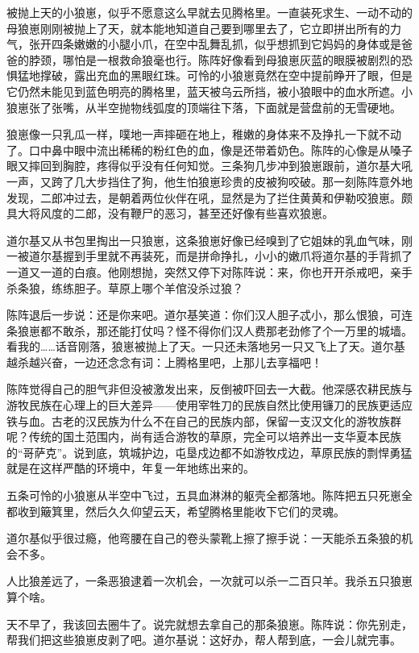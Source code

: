 \par 被抛上天的小狼崽，似乎不愿意这么早就去见腾格里。一直装死求生、一动不动的母狼崽刚刚被抛上了天，就本能地知道自己要到哪里去了，它立即拼出所有的力气，张开四条嫩嫩的小腿小爪，在空中乱舞乱抓，似乎想抓到它妈妈的身体或是爸爸的脖颈，哪怕是一根救命狼毫也行。陈阵好像看到母狼崽灰蓝的眼膜被剧烈的恐惧猛地撑破，露出充血的黑眼红珠。可怜的小狼崽竟然在空中提前睁开了眼，但是它仍然未能见到蓝色明亮的腾格里，蓝天被乌云所挡，被小狼眼中的血水所遮。小狼崽张了张嘴，从半空抛物线弧度的顶端往下落，下面就是营盘前的无雪硬地。
\par 狼崽像一只乳瓜一样，噗地一声摔砸在地上，稚嫩的身体来不及挣扎一下就不动了。口中鼻中眼中流出稀稀的粉红色的血，像是还带着奶色。陈阵的心像是从嗓子眼又摔回到胸腔，疼得似乎没有任何知觉。三条狗几步冲到狼崽跟前，道尔基大吼一声，又跨了几大步挡住了狗，他生怕狼崽珍贵的皮被狗咬破。那一刻陈阵意外地发现，二郎冲过去，是朝着两位伙伴在吼，显然是为了拦住黄黄和伊勒咬狼崽。颇具大将风度的二郎，没有鞭尸的恶习，甚至还好像有些喜欢狼崽。
\par 道尔基又从书包里掏出一只狼崽，这条狼崽好像已经嗅到了它姐妹的乳血气味，刚一被道尔基握到手里就不再装死，而是拼命挣扎，小小的嫩爪将道尔基的手背抓了一道又一道的白痕。他刚想抛，突然又停下对陈阵说：来，你也开开杀戒吧，亲手杀条狼，练练胆子。草原上哪个羊倌没杀过狼？
\par 陈阵退后一步说：还是你来吧。道尔基笑道：你们汉人胆子忒小，那么恨狼，可连条狼崽都不敢杀，那还能打仗吗？怪不得你们汉人费那老劲修了个一万里的城墙。看我的……话音刚落，狼崽被抛上了天。一只还未落地另一只又飞上了天。道尔基越杀越兴奋，一边还念念有词：上腾格里吧，上那儿去享福吧！
\par 陈阵觉得自己的胆气非但没被激发出来，反倒被吓回去一大截。他深感农耕民族与游牧民族在心理上的巨大差异——使用宰牲刀的民族自然比使用镰刀的民族更适应铁与血。古老的汉民族为什么不在自己的民族内部，保留一支汉文化的游牧族群呢？传统的国土范围内，尚有适合游牧的草原，完全可以培养出一支华夏本民族的“哥萨克”。说到底，筑城护边，屯垦戍边都不如游牧戍边，草原民族的剽悍勇猛就是在这样严酷的环境中，年复一年地练出来的。
\par 五条可怜的小狼崽从半空中飞过，五具血淋淋的躯壳全都落地。陈阵把五只死崽全都收到簸箕里，然后久久仰望云天，希望腾格里能收下它们的灵魂。
\par 道尔基似乎很过瘾，他弯腰在自己的卷头蒙靴上擦了擦手说：一天能杀五条狼的机会不多。
\par 人比狼差远了，一条恶狼逮着一次机会，一次就可以杀一二百只羊。我杀五只狼崽算个啥。
\par 天不早了，我该回去圈牛了。说完就想去拿自己的那条狼崽。陈阵说：你先别走，帮我们把这些狼崽皮剥了吧。道尔基说：这好办，帮人帮到底，一会儿就完事。
